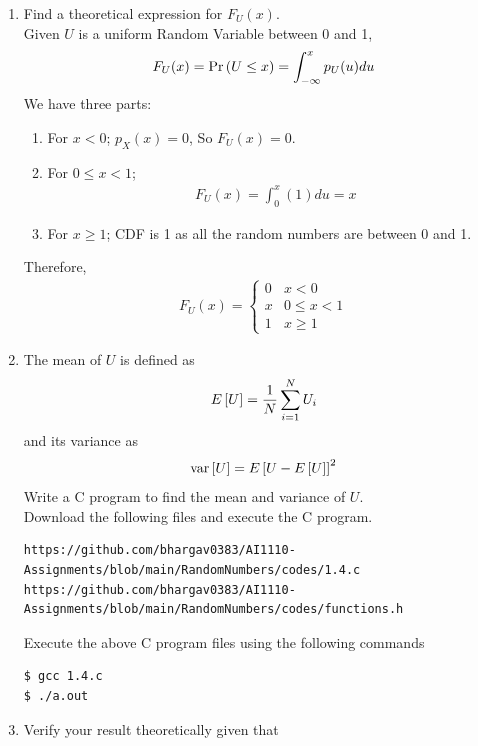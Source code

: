 \documentclass[journal,12pt,twocolumn]{IEEEtran}
\begin{document}
\begin{enumerate}[label=\thesection.\arabic*
,ref=\thesection.\theenumi]
\item
Find a  theoretical expression for $F_{U}(x)$.\\
\solution Given $U$ is a uniform Random Variable between 0 and 1,
\begin{align}
F_U(x) = \Pr\left(U \leq x\right) = \int_{-\infty}^{x}p_U(u)du
\end{align}
We have three parts:
		\begin{enumerate}[label=\roman*)]
			\item For $x < 0$; $p_X(x) = 0$, So $F_U(x) = 0$.
			\item For $0 \leq x < 1$;
				\begin{align}
					F_U(x) = \int_{0}^{x}(1)du = x
				\end{align}
			\item For $x \geq 1$; CDF is 1 as all the random numbers are between 0 and 1.
		\end{enumerate}
Therefore,
		\begin{align}
			F_U(x) = 
			\begin{cases}
				0 & x < 0 \\
				x & 0 \leq x < 1 \\
				1 & x \geq 1
			\end{cases}
		\end{align}
		
\item
The mean of $U$ is defined as
%
\begin{equation}
E{}\left[U\right] = \frac{1}{N}\sum_{i=1}^{N}U_i
\end{equation}
%
and its variance as
%
\begin{equation}
\text{var}{}\left[U\right] = E{}\left[U- E{}\left[U\right]\right]^2 
\end{equation}
Write a C program to  find the mean and variance of $U$. \\
\solution Download the following files and execute the  C program.
\begin{lstlisting}
https://github.com/bhargav0383/AI1110-Assignments/blob/main/RandomNumbers/codes/1.4.c
https://github.com/bhargav0383/AI1110-Assignments/blob/main/RandomNumbers/codes/functions.h
\end{lstlisting}
Execute the above C program files using the following commands
\begin{lstlisting}
$ gcc 1.4.c
$ ./a.out
\end{lstlisting}

\item Verify your result theoretically given that
\end{enumerate}
\end{document}
